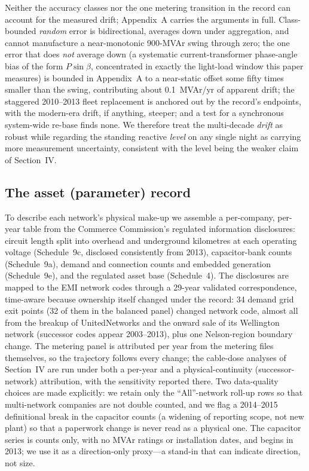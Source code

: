 \documentclass[journal]{IEEEtran}
\begin{document}
Neither the accuracy classes nor the one metering transition in the record can
account for the measured drift; Appendix~A carries the arguments in full.
Class-bounded \emph{random} error is bidirectional, averages down under
aggregation, and cannot manufacture a near-monotonic 900-MVAr swing through
zero; the one error that does \emph{not} average down (a systematic
current-transformer phase-angle bias of the form $P\sin\beta$, concentrated in
exactly the light-load window this paper measures) is bounded in Appendix~A to
a near-static offset some fifty times smaller than the swing, contributing
about 0.1~MVAr/yr of apparent drift; the staggered 2010--2013 fleet
replacement is anchored out by the record's endpoints, with the modern-era
drift, if anything, steeper; and a test for a synchronous system-wide re-base
finds none. We therefore treat the multi-decade \emph{drift} as robust while
regarding the standing reactive \emph{level} on any single night as carrying
more measurement uncertainty, consistent with the level being the weaker claim
of Section~IV.

\subsection{The asset (parameter) record}
To describe each network's physical make-up we assemble a per-company, per-year
table from the Commerce Commission's regulated information disclosures: circuit
length split into overhead and underground kilometres at each operating voltage
(Schedule~9c, disclosed consistently from 2013), capacitor-bank counts
(Schedule~9a), demand and connection counts
and embedded generation (Schedule~9e), and the regulated asset base (Schedule~4).
The disclosures are mapped to the EMI network codes through a 29-year validated
correspondence, time-aware because ownership itself changed under the record: 34
demand grid exit points (32 of them in the balanced panel) changed network code,
almost all from the breakup of UnitedNetworks and the onward sale of its
Wellington network (successor codes appear 2003--2013), plus one Nelson-region
boundary change. The metering panel is attributed per year from the metering
files themselves, so the trajectory follows every change; the cable-dose
analyses of Section~IV are run under both a per-year and a physical-continuity
(successor-network) attribution, with the sensitivity reported there. Two data-quality choices are made explicitly: we retain only the
``All''-network roll-up rows so that multi-network companies are not double
counted, and we flag a 2014--2015 definitional break in the capacitor counts (a
widening of reporting scope, not new plant) so that a paperwork change is never
read as a physical one. The capacitor series is counts only, with no MVAr ratings
or installation dates, and begins in 2013; we use it as a direction-only
proxy---a stand-in that can indicate direction, not size.
\end{document}
